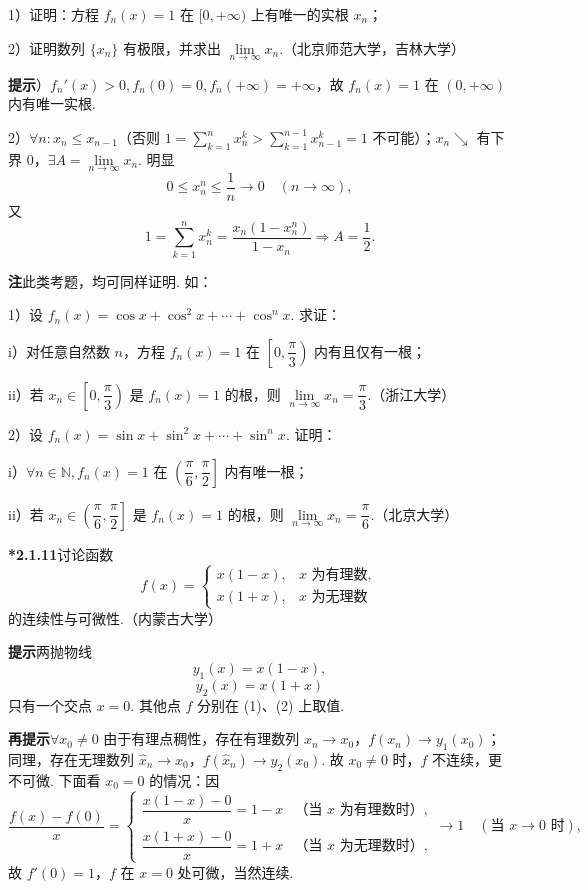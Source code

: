 \documentclass[UTF8, 12pt, fontset=fandol, oneside]{ctexart}
\begin{document}
1）证明：方程 $f_n(x)=1$ 在 $[0,+\infty)$ 上有唯一的实根 $x_n$；

2）证明数列 $\{x_n\}$ 有极限，并求出 $\lim\limits_{n\to\infty}x_n$.（北京师范大学，吉林大学）

\noindent\textbf{提示}）$f_n'(x)>0,f_n(0)=0,f_n(+\infty)=+\infty$，故 $f_n(x)=1$ 在 $(0,+\infty)$ 内有唯一实根.

2）$\forall n:x_n\le x_{n-1}$（否则 $1=\sum\limits_{k=1}^{n}x_n^k>\sum\limits_{k=1}^{n-1}x_{n-1}^k=1$ 不可能）；$x_n\searrow$ 有下界 $0$，$\exists A=\lim\limits_{n\to\infty}x_n$. 明显
\[
  0\le x_n^n\le\frac1n\to0\quad(n\to\infty),
\]
又
\[
  1=\sum_{k=1}^{n}x_n^k=\frac{x_n(1-x_n^n)}{1-x_n}\Rightarrow A=\frac12.
\]

\noindent\textbf{注}\quad 此类考题，均可同样证明. 如：

1）设 $f_n(x)=\cos x+\cos^2x+\cdots+\cos^n x$. 求证：

i）对任意自然数 $n$，方程 $f_n(x)=1$ 在 $\left[0,\dfrac\pi3\right)$ 内有且仅有一根；

ii）若 $x_n\in\left[0,\dfrac\pi3\right)$ 是 $f_n(x)=1$ 的根，则 $\lim\limits_{n\to\infty}x_n=\dfrac\pi3$.（浙江大学）

2）设 $f_n(x)=\sin x+\sin^2x+\cdots+\sin^n x$. 证明：

i）$\forall n\in\mathbb{N},f_n(x)=1$ 在 $\left(\dfrac\pi6,\dfrac\pi2\right]$ 内有唯一根；

ii）若 $x_n\in\left(\dfrac\pi6,\dfrac\pi2\right]$ 是 $f_n(x)=1$ 的根，则 $\lim\limits_{n\to\infty}x_n=\dfrac\pi6$.（北京大学）

\noindent\textbf{*2.1.11}\quad 讨论函数
\[
  f(x)=
  \begin{cases}
    x(1-x), & x\text{ 为有理数},\\
    x(1+x), & x\text{ 为无理数}
  \end{cases}
\]
的连续性与可微性.（内蒙古大学）

\noindent\textbf{提示}\quad 两抛物线
\[
  y_1(x)=x(1-x),
\tag{1}
\]
\[
  y_2(x)=x(1+x)
\tag{2}
\]
只有一个交点 $x=0$. 其他点 $f$ 分别在 (1)、(2) 上取值.

\noindent\textbf{再提示}\quad $\forall x_0\ne0$ 由于有理点稠性，存在有理数列 $x_n\to x_0$，$f(x_n)\to y_1(x_0)$；同理，存在无理数列 $\hat x_n\to x_0$，$f(\hat x_n)\to y_2(x_0)$. 故 $x_0\ne0$ 时，$f$ 不连续，更不可微. 下面看 $x_0=0$ 的情况：因
\[
  \frac{f(x)-f(0)}{x}=
  \begin{cases}
    \dfrac{x(1-x)-0}{x}=1-x & \text{（当 }x\text{ 为有理数时）},\\
    \dfrac{x(1+x)-0}{x}=1+x & \text{（当 }x\text{ 为无理数时）},
  \end{cases}
  \to1\quad(\text{当 }x\to0\text{ 时}),
\]
故 $f'(0)=1$，$f$ 在 $x=0$ 处可微，当然连续.
\end{document}
